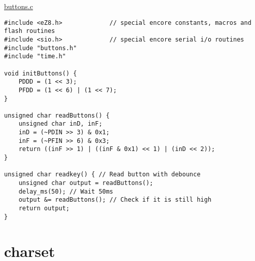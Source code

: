 \underline{buttons.c}
\begin{lstlisting}
#include <eZ8.h>             // special encore constants, macros and flash routines
#include <sio.h>             // special encore serial i/o routines
#include "buttons.h"
#include "time.h"

void initButtons() {
	PDDD = (1 << 3);
	PFDD = (1 << 6) | (1 << 7);
}

unsigned char readButtons() {
	unsigned char inD, inF;
	inD = (~PDIN >> 3) & 0x1;
	inF = (~PFIN >> 6) & 0x3;
	return ((inF >> 1) | ((inF & 0x1) << 1) | (inD << 2));
}

unsigned char readkey() { // Read button with debounce
	unsigned char output = readButtons();
	delay_ms(50); // Wait 50ms
	output &= readButtons(); // Check if it is still high
	return output;
}
\end{lstlisting}


\section{charset}
\label{charset}

